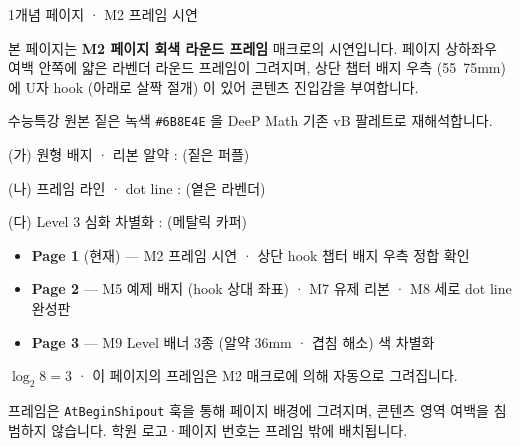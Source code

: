 \documentclass[11pt,a4paper]{article}
\begin{document}

\begin{dmconcept}[195mm]{1}{개념 페이지 · M2 프레임 시연}

\vspace{2mm}
본 페이지는 \textbf{M2 페이지 회색 라운드 프레임} 매크로의 시연입니다.
페이지 상하좌우 여백 안쪽에 얇은 라벤더 라운드 프레임이 그려지며, 상단
챕터 배지 우측 (55~75mm) 에 U자 hook (아래로 살짝 절개) 이 있어 콘텐츠
진입감을 부여합니다.

\vspace{2mm}

수능특강 원본 짙은 녹색 \texttt{\#6B8E4E} 을 DeeP Math 기존 vB 팔레트로
재해석합니다.

\begin{dmoptionbox}
(가) 원형 배지 · 리본 알약 :  (짙은 퍼플)

(나) 프레임 라인 · dot line :  (옅은 라벤더)

(다) Level 3 심화 차별화 :  (메탈릭 카퍼)
\end{dmoptionbox}


\begin{itemize}
\item \textbf{Page 1} (현재) — M2 프레임 시연 · 상단 hook 챕터 배지 우측 정합 확인
\item \textbf{Page 2} — M5 예제 배지 (hook 상대 좌표) · M7 유제 리본 · M8 세로 dot line 완성판
\item \textbf{Page 3} — M9 Level 배너 3종 (알약 36mm · 겹침 해소) 색 차별화
\end{itemize}

\begin{dmexample}
$\log_2 8 = 3$ · 이 페이지의 프레임은 M2 매크로에 의해 자동으로 그려집니다.
\end{dmexample}

\begin{dmnote}
프레임은 \texttt{AtBeginShipout} 훅을 통해 페이지 배경에 그려지며,
콘텐츠 영역 여백을 침범하지 않습니다. 학원 로고·페이지 번호는 프레임 밖에
배치됩니다.
\end{dmnote}

\end{dmconcept}
\end{document}
